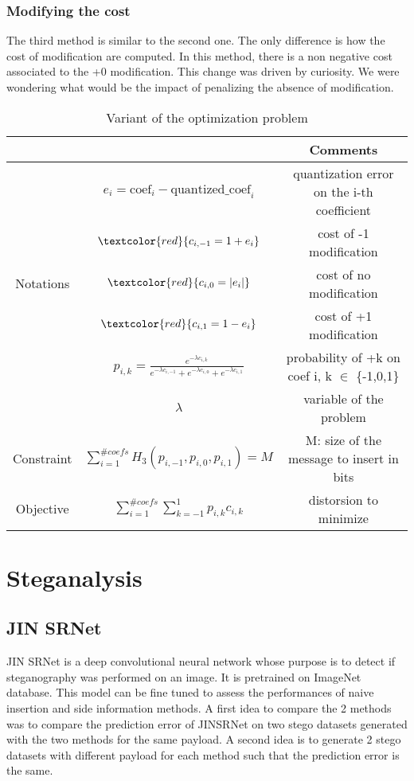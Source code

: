 \documentclass[12pt]{article}
\begin{document}
\subsubsection{Modifying the cost}
The third method is similar to the second one. The only difference is how the cost of modification are computed. In this method, there is a non negative cost associated to the +0 modification. This change was driven by curiosity. We were wondering what would be the impact of penalizing the absence of modification.
\begin{table}[H]
\begin{tabular}{ |c|c|c| }
    \hline
    &  & Comments\\
    \hline
    & $e_i = \text{coef}_i - \text{quantized\_coef}_i$ & quantization error on the i-th coefficient\\ 
    & $\textcolor{red}{c_{i,-1} = 1 + e_i}$ & cost of -1 modification\\ 
    Notations & $\textcolor{red}{c_{i,0} = |e_i|}$ & cost of no modification\\
    & $\textcolor{red}{c_{i,1} = 1 - e_i}$ & cost of +1 modification\\
    & $p_{i,k} = \frac{e^{-\lambda c_{i,k}}}{e^{-\lambda c_{i,-1}} + e^{-\lambda c_{i,0}} + e^{-\lambda c_{i,1}}}$ & probability of +k on coef i, k $\in$ \{-1,0,1\}\\
    & $\lambda$ & variable of the problem\\
    \hline
    Constraint & $\displaystyle\sum_{i=1}^{\# coefs}{H_3(p_{i,-1},p_{i,0},p_{i,1})} = M$ & M: size of the message to insert in bits\\
    \hline
    Objective & $\displaystyle\sum_{i=1}^{\# coefs}{\sum_{k=-1}^{1}{p_{i,k}c_{i,k}}}$ & distorsion to minimize \\ 
    \hline
\end{tabular}
\caption[Side information variant]{Variant of the optimization problem}
\end{table}

\section{Steganalysis}
\subsection{JIN SRNet}
JIN SRNet is a deep convolutional neural network whose purpose is to detect if steganography was performed on an image. It is pretrained on ImageNet database. This model can be fine tuned to assess the performances of naive insertion and side information methods. A first idea to compare the 2 methods was to compare the prediction error of JINSRNet on two stego datasets generated with the two methods for the same payload. A second idea is to generate 2 stego datasets with different payload for each method such that the prediction error is the same. 
\end{document}

